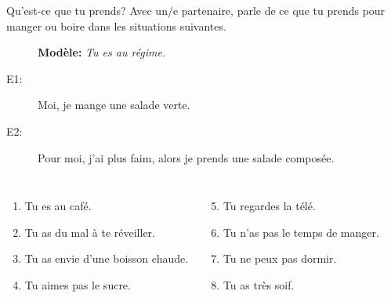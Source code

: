 \begin{frame}{Qu'est-ce que tu prends?}
  Avec un/e partenaire, parle de ce que tu prends pour manger ou boire dans les situations suivantes. \\
  \begin{description}
    \item[] \textbf{Modèle:} \emph{Tu es au régime.}
    \item[E1:] Moi, je mange une salade verte.
    \item[E2:] Pour moi, j'ai plus faim, alors je prends une salade composée.
  \end{description}
  \begin{columns}[t]
      \begin{enumerate}
        \item Tu es au café.
        \item Tu as du mal à te réveiller.
        \item Tu as envie d'une boisson chaude.
        \item Tu aimes pas le sucre.
      \end{enumerate}
      \begin{enumerate}
        \setcounter{enumi}{4}
        \item Tu regardes la télé.
        \item Tu n'as pas le temps de manger.
        \item Tu ne peux pas dormir.
        \item Tu as très soif.
      \end{enumerate}
  \end{columns}
\end{frame}
